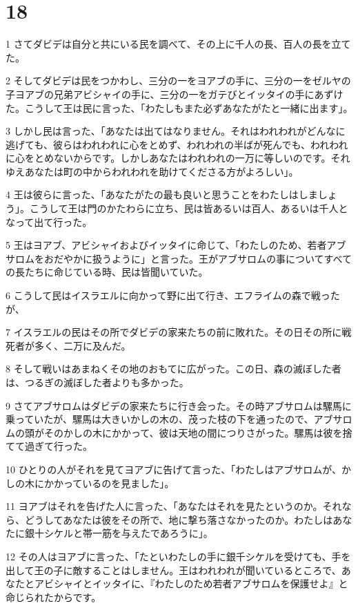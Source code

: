 \chapter{18}

\par 1 さてダビデは自分と共にいる民を調べて、その上に千人の長、百人の長を立てた。
\par 2 そしてダビデは民をつかわし、三分の一をヨアブの手に、三分の一をゼルヤの子ヨアブの兄弟アビシャイの手に、三分の一をガテびとイッタイの手にあずけた。こうして王は民に言った、「わたしもまた必ずあなたがたと一緒に出ます」。
\par 3 しかし民は言った、「あなたは出てはなりません。それはわれわれがどんなに逃げても、彼らはわれわれに心をとめず、われわれの半ばが死んでも、われわれに心をとめないからです。しかしあなたはわれわれの一万に等しいのです。それゆえあなたは町の中からわれわれを助けてくださる方がよろしい」。
\par 4 王は彼らに言った、「あなたがたの最も良いと思うことをわたしはしましょう」。こうして王は門のかたわらに立ち、民は皆あるいは百人、あるいは千人となって出て行った。
\par 5 王はヨアブ、アビシャイおよびイッタイに命じて、「わたしのため、若者アブサロムをおだやかに扱うように」と言った。王がアブサロムの事についてすべての長たちに命じている時、民は皆聞いていた。
\par 6 こうして民はイスラエルに向かって野に出て行き、エフライムの森で戦ったが、
\par 7 イスラエルの民はその所でダビデの家来たちの前に敗れた。その日その所に戦死者が多く、二万に及んだ。
\par 8 そして戦いはあまねくその地のおもてに広がった。この日、森の滅ぼした者は、つるぎの滅ぼした者よりも多かった。
\par 9 さてアブサロムはダビデの家来たちに行き会った。その時アブサロムは騾馬に乗っていたが、騾馬は大きいかしの木の、茂った枝の下を通ったので、アブサロムの頭がそのかしの木にかかって、彼は天地の間につりさがった。騾馬は彼を捨てて過ぎて行った。
\par 10 ひとりの人がそれを見てヨアブに告げて言った、「わたしはアブサロムが、かしの木にかかっているのを見ました」。
\par 11 ヨアブはそれを告げた人に言った、「あなたはそれを見たというのか。それなら、どうしてあなたは彼をその所で、地に撃ち落さなかったのか。わたしはあなたに銀十シケルと帯一筋を与えたであろうに」。
\par 12 その人はヨアブに言った、「たといわたしの手に銀千シケルを受けても、手を出して王の子に敵することはしません。王はわれわれが聞いているところで、あなたとアビシャイとイッタイに、『わたしのため若者アブサロムを保護せよ』と命じられたからです。

